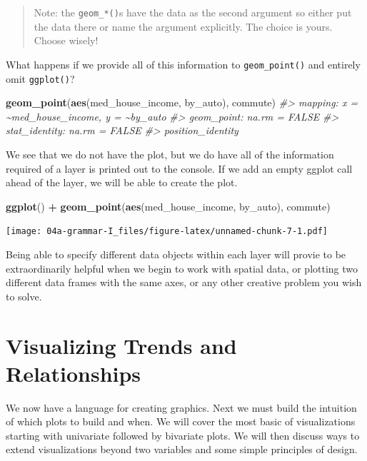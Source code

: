 \documentclass[
]{book}
\newenvironment{Shaded}{\begin{snugshade}}{\end{snugshade}}
\newcommand{\CommentTok}[1]{\textcolor[rgb]{0.56,0.35,0.01}{\textit{#1}}}
\newcommand{\KeywordTok}[1]{\textcolor[rgb]{0.13,0.29,0.53}{\textbf{#1}}}
\newcommand{\NormalTok}[1]{#1}
\newcommand{\OperatorTok}[1]{\textcolor[rgb]{0.81,0.36,0.00}{\textbf{#1}}}
\newcommand{\StringTok}[1]{\textcolor[rgb]{0.31,0.60,0.02}{#1}}
\begin{document}
\begin{quote}
Note: the \texttt{geom\_*()}s have the data as the second argument so either put the data there or name the argument explicitly. The choice is yours. Choose wisely!
\end{quote}

What happens if we provide all of this information to \texttt{geom\_point()} and entirely omit \texttt{ggplot()}?

\begin{Shaded}
\begin{Highlighting}[]
\KeywordTok{geom\_point}\NormalTok{(}\KeywordTok{aes}\NormalTok{(med\_house\_income, by\_auto), commute)}
\CommentTok{\#\textgreater{} mapping: x = \textasciitilde{}med\_house\_income, y = \textasciitilde{}by\_auto }
\CommentTok{\#\textgreater{} geom\_point: na.rm = FALSE}
\CommentTok{\#\textgreater{} stat\_identity: na.rm = FALSE}
\CommentTok{\#\textgreater{} position\_identity}
\end{Highlighting}
\end{Shaded}

We see that we do not have the plot, but we do have all of the information required of a layer is printed out to the console. If we add an empty ggplot call ahead of the layer, we will be able to create the plot.

\begin{Shaded}
\begin{Highlighting}[]
\KeywordTok{ggplot}\NormalTok{() }\OperatorTok{+}\StringTok{ }
\StringTok{  }\KeywordTok{geom\_point}\NormalTok{(}\KeywordTok{aes}\NormalTok{(med\_house\_income, by\_auto), commute)}
\end{Highlighting}
\end{Shaded}

\texttt{[image: 04a-grammar-I\_files/figure-latex/unnamed-chunk-7-1.pdf]}

Being able to specify different data objects within each layer will provie to be extraordinarily helpful when we begin to work with spatial data, or plotting two different data frames with the same axes, or any other creative problem you wish to solve.

\hypertarget{visualizing-trends-and-relationships}{%
\chapter{Visualizing Trends and Relationships}\label{visualizing-trends-and-relationships}}

We now have a language for creating graphics. Next we must build the intuition of which plots to build and when. We will cover the most basic of visualizations starting with univariate followed by bivariate plots. We will then discuss ways to extend visualizations beyond two variables and some simple principles of design.
\end{document}
